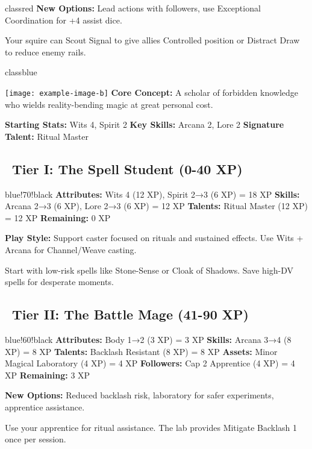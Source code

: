 \documentclass[11pt]{article}
\begin{document}
\begin{classguide}{classred}
\textbf{New Options:} Lead actions with followers, use Exceptional Coordination for +4 assist dice.

\begin{tipbox}
Your squire can Scout Signal to give allies Controlled position or Distract Draw to reduce enemy rails.
\end{tipbox}
\end{classguide}

\newpage

\begin{classguide}{classblue}
\begin{multicols}{2}
\texttt{[image: example-image-b]}
\columnbreak
\textbf{Core Concept:} A scholar of forbidden knowledge who wields reality-bending magic at great personal cost.

\textbf{Starting Stats:} Wits 4, Spirit 2
\textbf{Key Skills:} Arcana 2, Lore 2
\textbf{Signature Talent:} Ritual Master
\end{multicols}

\subsection*{\faStar\ Tier I: The Spell Student (0-40 XP)}
\begin{tierbox}{blue!70!black}
\textbf{Attributes:} Wits 4 (12 XP), Spirit 2→3 (6 XP) = 18 XP
\textbf{Skills:} Arcana 2→3 (6 XP), Lore 2→3 (6 XP) = 12 XP
\textbf{Talents:} Ritual Master (12 XP) = 12 XP
\textbf{Remaining:} 0 XP
\end{tierbox}

\textbf{Play Style:} Support caster focused on rituals and sustained effects. Use Wits + Arcana for Channel/Weave casting.

\begin{tipbox}
Start with low-risk spells like Stone-Sense or Cloak of Shadows. Save high-DV spells for desperate moments.
\end{tipbox}

\subsection*{\faStar\faStar\ Tier II: The Battle Mage (41-90 XP)}
\begin{tierbox}{blue!60!black}
\textbf{Attributes:} Body 1→2 (3 XP) = 3 XP
\textbf{Skills:} Arcana 3→4 (8 XP) = 8 XP
\textbf{Talents:} Backlash Resistant (8 XP) = 8 XP
\textbf{Assets:} Minor Magical Laboratory (4 XP) = 4 XP
\textbf{Followers:} Cap 2 Apprentice (4 XP) = 4 XP
\textbf{Remaining:} 3 XP
\end{tierbox}

\textbf{New Options:} Reduced backlash risk, laboratory for safer experiments, apprentice assistance.

\begin{tipbox}
Use your apprentice for ritual assistance. The lab provides Mitigate Backlash 1 once per session.
\end{tipbox}
\end{classguide}
\end{document}
